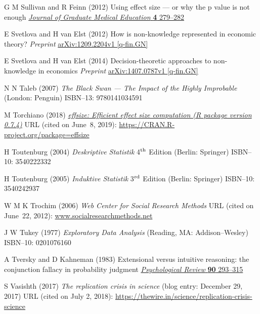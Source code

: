 \begin{thebibliography}{99}
G M Sullivan and R Feinn
(2012) Using effect size --- or why the p value is not enough
\href{https://doi.org/10.4300/JGME-D-12-00156.1}{\textit{Journal of
Graduate Medical Education} \textbf{4} 279--282}

E Svetlova and H van Elst
(2012) How is non-knowledge represented in economic theory?
\textit{Preprint} 
\href{http://arxiv.org/abs/1209.2204}{arXiv:1209.2204v1 [q-fin.GN]}

E Svetlova and H van Elst
(2014) Decision-theoretic approaches to non-knowledge in economics
\textit{Preprint} 
\href{http://arxiv.org/abs/1407.0787}{arXiv:1407.0787v1 [q-fin.GN]}

N N Taleb
(2007) \textit{The Black Swan --- The Impact of the Highly
Improbable} (London: Penguin)
ISBN--13: 9780141034591

M Torchiano
(2018) \href{https://doi.org/10.5281/zenodo.1480624}{\textit{effsize:
Efficient effect size computation (R package version 0.7.4)}}
URL (cited on June~8, 2019): 
\href{https://CRAN.R-project.org/package=effsize}{https://CRAN.R-project.org/package=effsize}

H Toutenburg
(2004) \textit{Deskriptive Statistik}
4$^{\rm th}$ Edition (Berlin: Springer) ISBN--10: 3540222332

H Toutenburg
(2005) \textit{Induktive Statistik}
3$^{\rm rd}$ Edition (Berlin: Springer) ISBN--10: 3540242937

W M K Trochim
(2006) \textit{Web Center for Social Research Methods} URL (cited
on June~22, 2012): \href{http://www.socialresearchmethods.net/}{www.socialresearchmethods.net}

J W Tukey
(1977) \textit{Exploratory Data Analysis}
(Reading, MA: Addison--Wesley)
ISBN--10: 0201076160

A Tversky and D Kahneman
(1983) Extensional versus intuitive reasoning: the conjunction 
fallacy in probability judgment
\href{http://dx.doi.org/10.1037/0033-295X.90.4.293}{\textit{Psychological Review} \textbf{90} 293--315}

S Vasishth
(2017) \textit{The replication crisis in science} (blog entry: 
December 29, 2017) URL (cited on July 2, 2018): 
\href{https://thewire.in/science/replication-crisis-science}{https://thewire.in/science/replication-crisis-science}


\end{thebibliography}
